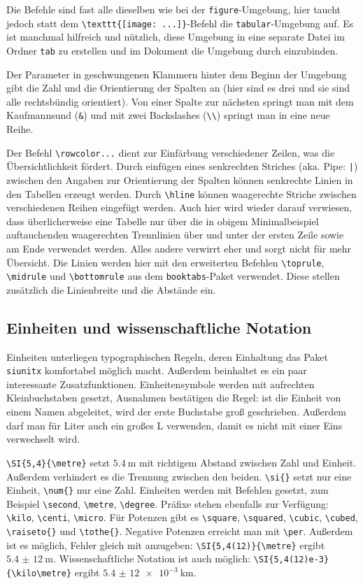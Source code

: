 Die Befehle sind fast alle dieselben wie bei der \verb|figure|-Umgebung, hier taucht jedoch statt dem \verb|\texttt{[image: ...]}|-Befehl die \verb|tabular|-Umgebung auf. Es ist manchmal hilfreich und nützlich, diese Umgebung in eine separate Datei im Ordner \verb|tab| zu erstellen und im Dokument die Umgebung durch \verb|| einzubinden.

Der Parameter in geschwungenen Klammern hinter dem Beginn der Umgebung gibt die Zahl und die Orientierung der Spalten an (hier sind es drei und sie sind alle rechtsbündig orientiert). Von einer Spalte zur nächsten springt man mit dem Kaufmannsund (\verb|&|) und mit zwei Backslashes (\verb|\\|) springt man in eine neue Reihe.

Der Befehl \verb|\rowcolor...| dient zur Einfärbung verschiedener Zeilen, was die Übersichtlichkeit fördert. Durch einfügen eines senkrechten Striches (aka. Pipe: \verb&|&) zwischen den Angaben zur Orientierung der Spalten können senkrechte Linien in den Tabellen erzeugt werden. Durch \verb|\hline| können waagerechte Striche zwischen verschiedenen Reihen eingefügt werden. Auch hier wird wieder darauf verwiesen, dass überlicherweise eine Tabelle nur über die in obigem Minimalbeispiel auftauchenden waagerechten Trennlinien über und unter der ersten Zeile sowie am Ende verwendet werden.  Alles andere verwirrt eher und sorgt nicht für mehr Übersicht. Die Linien werden hier mit den erweiterten Befehlen \verb|\toprule|, \verb|\midrule| und \verb|\bottomrule| aus dem \verb|booktabs|-Paket verwendet. Diese stellen zusätzlich die Linienbreite und die Abstände ein.

\subsection{Einheiten und wissenschaftliche Notation}
Einheiten unterliegen typographischen Regeln, deren Einhaltung das Paket \verb|siunitx| komfortabel möglich macht. Außerdem beinhaltet es ein paar interessante Zusatzfunktionen. Einheitensymbole werden mit aufrechten Kleinbuchstaben gesetzt, Ausnahmen bestätigen die Regel: ist die Einheit von einem Namen abgeleitet, wird der erste Buchstabe groß geschrieben. Außerdem darf man für Liter auch ein großes L verwenden, damit es nicht mit einer Eins verwechselt wird.

\verb|\SI{5,4}{\metre}| setzt $\SI{5,4}{\metre}$ mit richtigem Abstand zwischen Zahl und Einheit. Außerdem verhindert es die Trennung zwischen den beiden. \verb|\si{}| setzt nur eine Einheit, \verb|\num{}| nur eine Zahl. Einheiten werden mit Befehlen gesetzt, zum Beispiel \verb|\second|, \verb|\metre|, \verb|\degree|. Präfixe stehen ebenfalls zur Verfügung: \verb|\kilo|, \verb|\centi|, \verb|\micro|. Für Potenzen gibt es \verb|\square|, \verb|\squared|, \verb|\cubic|, \verb|\cubed|, \verb|\raiseto{}| und \verb|\tothe{}|. Negative Potenzen erreicht man mit \verb|\per|. Außerdem ist es möglich, Fehler gleich mit anzugeben: \verb|\SI{5,4(12)}{\metre}| ergibt $\SI{5,4(12)}{\metre}$. Wissenschaftliche Notation ist auch möglich: \verb|\SI{5,4(12)e-3}{\kilo\metre}| ergibt $\SI{5,4(12)e-3}{\kilo\metre}$.

